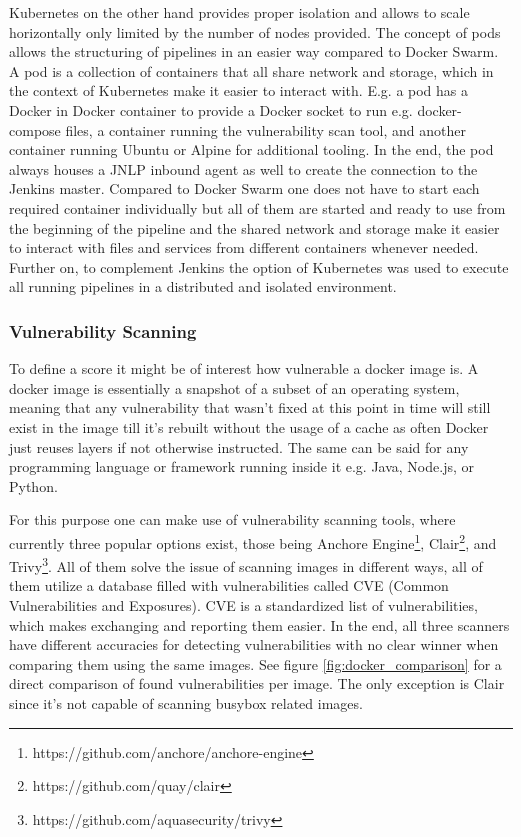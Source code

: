 Kubernetes on the other hand provides proper isolation and allows to scale horizontally only limited by the number of nodes provided. The concept of pods allows the structuring of pipelines in an easier way compared to Docker Swarm. A pod is a collection of containers that all share network and storage, which in the context of Kubernetes make it easier to interact with. E.g. a pod has a Docker in Docker container to provide a Docker socket to run e.g. docker-compose files, a container running the vulnerability scan tool, and another container running Ubuntu or Alpine for additional tooling. In the end, the pod always houses a JNLP inbound agent as well to create the connection to the Jenkins master. Compared to Docker Swarm one does not have to start each required container individually but all of them are started and ready to use from the beginning of the pipeline and the shared network and storage make it easier to interact with files and services from different containers whenever needed.
Further on, to complement Jenkins the option of Kubernetes was used to execute all running pipelines in a distributed and isolated environment.

\subsubsection{Vulnerability Scanning}
\label{sec:vulnerability_scanning}
To define a score it might be of interest how vulnerable a docker image is. A docker image is essentially a snapshot of a subset of an operating system, meaning that any vulnerability that wasn't fixed at this point in time will still exist in the image till it's rebuilt without the usage of a cache as often Docker just reuses layers if not otherwise instructed. The same can be said for any programming language or framework running inside it e.g. Java, Node.js, or Python.

For this purpose one can make use of vulnerability scanning tools, where currently three popular options exist, those being Anchore Engine\footnote{https://github.com/anchore/anchore-engine}, Clair\footnote{https://github.com/quay/clair}, and Trivy\footnote{https://github.com/aquasecurity/trivy}.
All of them solve the issue of scanning images in different ways, all of them utilize a database filled with vulnerabilities called CVE (Common Vulnerabilities and Exposures). CVE is a standardized list of vulnerabilities, which makes exchanging and reporting them easier.
In the end, all three scanners have different accuracies for detecting vulnerabilities with no clear winner when comparing them using the same images. See figure \ref{fig:docker_comparison} for a direct comparison of found vulnerabilities per image. The only exception is Clair since it's not capable of scanning busybox related images.

